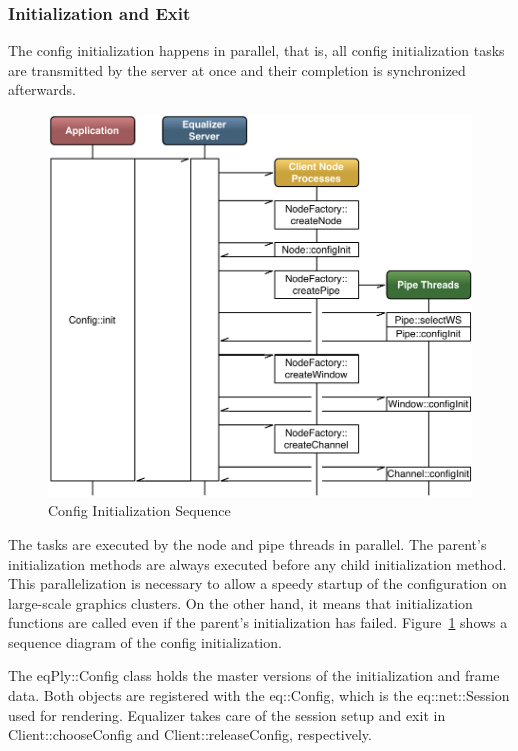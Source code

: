 \documentclass[10pt,a4]{scrartcl}
\newcommand{\fig}[1]{Figure~\ref{#1}}
\begin{document}
\subsubsection{Initialization and Exit}

The config initialization happens in parallel, that is, all config
initialization tasks are transmitted by the server at once and their
completion is synchronized afterwards. 

\begin{figure}[ht!]\center
  \vspace{-2ex}
  \includegraphics[width=.9\textwidth]{images/configInit.pdf}
  {\caption{\label{fConfigInit}Config Initialization Sequence}}
  \vspace{-4ex}
\end{figure}
The tasks are executed by the node and pipe threads in parallel. The
parent's initialization methods are always executed before any child
initialization method. This parallelization is necessary to allow a
speedy startup of the configuration on large-scale graphics clusters. On
the other hand, it means that initialization functions are called even
if the parent's initialization has failed. \fig{fConfigInit} shows a
sequence diagram of the config initialization.

The \textsf{eqPly::Config} class holds the master versions of the
initialization and frame data. Both objects are registered with the
\textsf{eq::Config}, which is the \textsf{eq::net::Session} used for
rendering. Equalizer takes care of the session setup and exit in
\textsf{Client::choose\-Config} and \textsf{Client::releaseConfig},
respectively.
\end{document}
